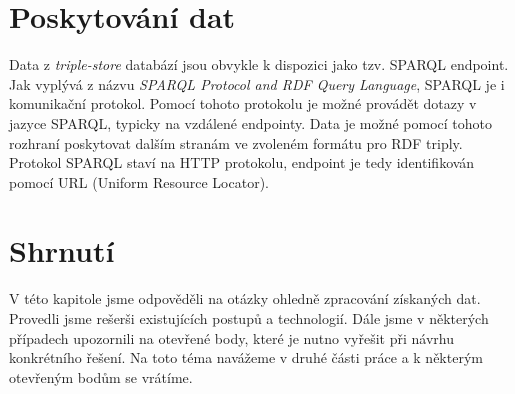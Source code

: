 \section{Poskytování dat}
Data z \textit{triple-store} databází jsou obvykle k dispozici jako tzv. SPARQL endpoint. Jak vyplývá z názvu \textit{SPARQL Protocol and RDF Query Language}, SPARQL je i komunikační protokol. Pomocí tohoto protokolu je možné provádět dotazy v jazyce SPARQL, typicky na vzdálené endpointy. Data je možné pomocí tohoto rozhraní poskytovat dalším stranám ve zvoleném formátu pro RDF triply. Protokol SPARQL staví na HTTP protokolu, endpoint je tedy identifikován pomocí URL (Uniform Resource Locator).

\section{Shrnutí}
V této kapitole jsme odpověděli na otázky ohledně zpracování získaných dat. Provedli jsme rešerši existujících postupů a technologií. Dále jsme v některých případech upozornili na otevřené body, které je nutno vyřešit při návrhu konkrétního řešení. Na toto téma navážeme v druhé části práce a k některým otevřeným bodům se vrátíme.











